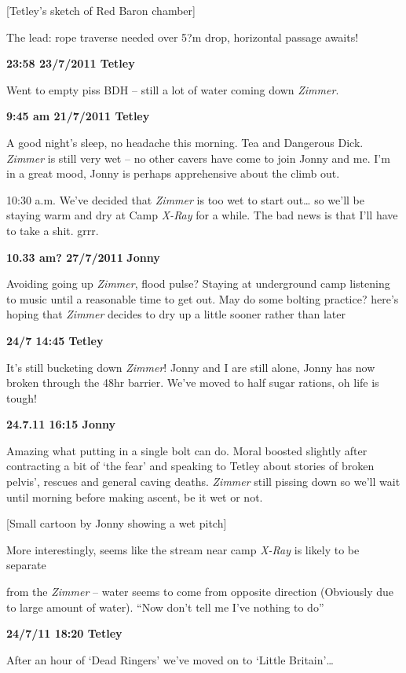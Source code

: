 {[}Tetley's sketch of Red Baron chamber{]}

The lead: rope traverse needed over 5?m drop, horizontal passage awaits!

\textbf{23:58 23/7/2011 Tetley}

Went to empty piss BDH -- still a lot of water coming down
\emph{Zimmer}.

\textbf{9:45 am 21/7/2011 Tetley}

A good night's sleep, no headache this morning. Tea and Dangerous Dick.
\emph{Zimmer} is still very wet -- no other cavers have come to join
Jonny and me. I'm in a great mood, Jonny is perhaps apprehensive about
the climb out.

10:30 a.m. We've decided that \emph{Zimmer} is too wet to start
out\ldots{} so we'll be staying warm and dry at Camp \emph{X-Ray} for a
while. The bad news is that I'll have to take a shit. grrr.

\textbf{10.33 am? 27/7/2011} \textbf{Jonny}

Avoiding going up \emph{Zimmer}, flood pulse? Staying at underground
camp listening to music until a reasonable time to get out. May do some
bolting practice? here's hoping that \emph{Zimmer} decides to dry up a
little sooner rather than later

\textbf{24/7 14:45 Tetley}

It's still bucketing down \emph{Zimmer}! Jonny and I are still alone,
Jonny has now broken through the 48hr barrier. We've moved to half sugar
rations, oh life is tough!

\textbf{24.7.11 16:15 Jonny}

Amazing what putting in a single bolt can do. Moral boosted slightly
after contracting a bit of `the fear' and speaking to Tetley about
stories of broken pelvis', rescues and general caving deaths.
\emph{Zimmer} still pissing down so we'll wait until morning before
making ascent, be it wet or not.

{[}Small cartoon by Jonny showing a wet pitch{]}

More interestingly, seems like the stream near camp \emph{X-Ray} is
likely to be separate

from the \emph{Zimmer} -- water seems to come from opposite direction
(Obviously due to large amount of water). ``Now don't tell me I've
nothing to do''

\textbf{24/7/11 18:20 Tetley}

After an hour of `Dead Ringers' we've moved on to `Little
Britain'\ldots{}

